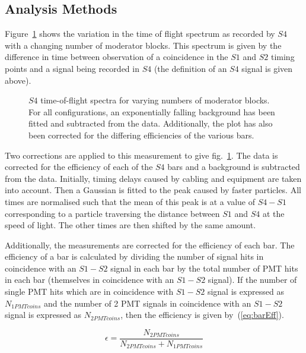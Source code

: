 \subsection{Analysis Methods}

	Figure~\ref{fig:s4tof} shows the variation in the time of flight spectrum as recorded by $S4$ with a changing number of moderator blocks.
	This spectrum is given by the difference in time between observation of a coincidence in the $S1$ and $S2$ timing points and a signal being recorded in $S4$ (the definition of an $S4$ signal is given above).
	
	\begin{figure}[h]
		\begin{adjustbox}{max totalsize={.8\textwidth}{.5\textheight},center}
			
		\end{adjustbox}
		\caption{$S4$ time-of-flight spectra for varying numbers of moderator blocks. For all configurations, an exponentially falling background has been fitted and subtracted from the data. Additionally, the plot has also been corrected for the differing efficiencies of the various bars.}
		\label{fig:s4tof}	
	\end{figure}

	Two corrections are applied to this measurement to give fig.~\ref{fig:s4tof}. 
	The data is corrected for the efficiency of each of the $S4$ bars and a background is subtracted from the data.
	Initially, timing delays caused by cabling and equipment are taken into account.
	Then a Gaussian is fitted to the peak caused by faster particles.
	All times are normalised such that the mean of this peak is at a value of $S4 - S1$ corresponding to a particle traversing the distance between $S1$ and $S4$ at the speed of light. 
	The other times are then shifted by the same amount.
	
	Additionally, the measurements are corrected for the efficiency of each bar. 
	The efficiency of a bar is calculated by dividing the number of signal hits in coincidence with an $S1-S2$ signal in each bar by the total number of PMT hits in each bar (themselves in coincidence with an $S1-S2$ signal). 
	If the number of single PMT hits which are in coincidence with $S1-S2$ signal is expressed as $N_{1PMTcoins}$ and the number of 2 PMT signals in coincidence with an $S1-S2$ signal is expressed as $N_{2PMTcoins}$, then the efficiency is given by~(\ref{eq:barEff}).
	
	\begin{equation}
		\epsilon = \frac{N_{2PMTcoins}}{N_{2PMTcoins}+N_{1PMTcoins}}
		\label{eq:barEff}
	\end{equation}
	
